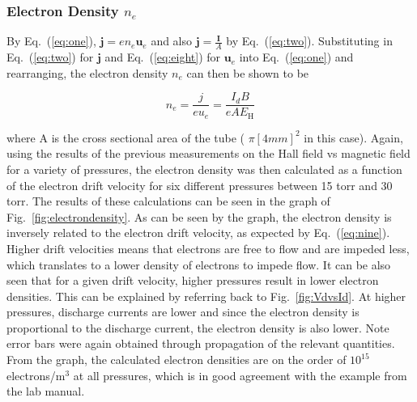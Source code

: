 \documentclass[%
 aip,
rsi,%
 amsmath,amssymb,
 reprint,%
author-numerical,%
]{revtex4-1}
\begin{document}
\subsubsection{Electron Density $n_{e}$}
By Eq.~(\ref{eq:one}), $\boldsymbol{j} = e n _ { e } \boldsymbol { u } _ { e }$ and also $\boldsymbol{j}= \frac{\boldsymbol { I }}{A}$ by Eq.~(\ref{eq:two}). Substituting in Eq.~(\ref{eq:two}) for $\boldsymbol{j}$ and Eq.~(\ref{eq:eight}) for $ \boldsymbol { u } _ { e }$ into Eq.~(\ref{eq:one}) and rearranging, the electron density $n _ { e }$ can then be shown to be 


\begin{equation}
n _ { e } = \frac { j } { e u _ { e } }=\frac { I _ { d } B } { e A E _ { \mathrm { H } } }
\label{eq:nine}
\end{equation}

\noindent where A is the cross sectional area of the tube ( $\pi[4mm]^2$ in this case). \newline
\indent Again, using the results of the previous measurements on the Hall field vs magnetic field for a variety of pressures, the electron density was then calculated as a function of the electron drift velocity for six different pressures between 15 torr and 30 torr. The results of these calculations can be seen in the graph of Fig.~\ref{fig:electrondensity}. \newline
\indent As can be seen by the graph, the electron density is inversely related to the electron drift velocity, as expected by Eq.~(\ref{eq:nine}). Higher drift velocities means that electrons are free to flow and are impeded less, which translates to a lower density of electrons to impede flow. It can be also seen that for a given drift velocity, higher pressures result in lower electron densities. This can be explained by referring back to Fig.~\ref{fig:VdvsId}. At higher pressures, discharge currents are lower and since the electron density is proportional to the discharge current, the electron density is also lower. Note error bars were again obtained through propagation of the relevant quantities. \newline
\indent From the graph, the calculated electron densities are on the order of $10^{15}$ electrons/m$^{3}$ at all pressures, which is in good agreement with the example from the lab manual.
\end{document}
